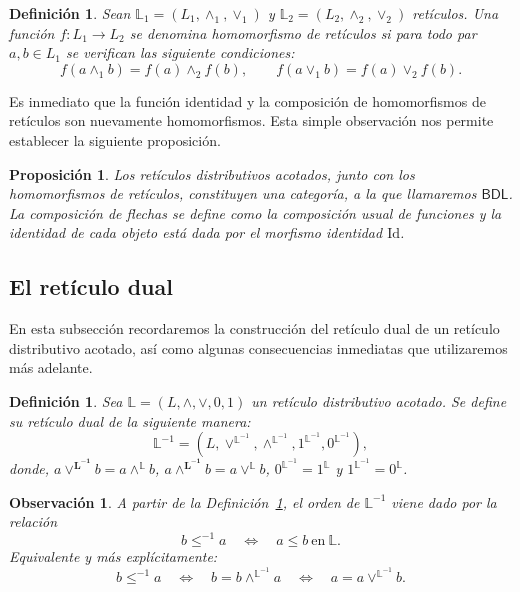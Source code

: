 \documentclass[12pt]{book}
\newtheorem{proposition}[theorem]{Proposición}
\newtheorem{definition}[theorem]{Definición}
\newtheorem{remark}[theorem]{Observación}
\newcommand{\we}{\wedge}
\newcommand{\Id}{\mathrm{Id}}
\newcommand{\BDL}{\mathsf{BDL}}
\begin{document}
\begin{definition}\label{def:homomorfismo_reticulos}
Sean \( \mathbb{L}_{1}=(L_{1},\wedge_{1},\vee_{1}) \) y
\( \mathbb{L}_{2}=(L_{2},\wedge_{2},\vee_{2}) \) retículos.
Una función \( f\colon L_{1}\to L_{2} \) se denomina
\emph{homomorfismo de retículos} si para todo par \( a,b\in L_{1} \) se verifican las siguiente condiciones:
\[
f(a\wedge_{1} b)=f(a)\wedge_{2} f(b), 
\qquad
f(a\vee_{1} b)=f(a)\vee_{2} f(b).
\]
\end{definition}


Es inmediato que la función identidad y la composición de homomorfismos de retículos
son nuevamente homomorfismos. Esta simple observación nos permite establecer la siguiente proposición.


\begin{proposition}
Los retículos distributivos acotados, junto con los homomorfismos de retículos, constituyen una categoría, a la que llamaremos $\BDL$.
La composición de flechas se define como la composición usual de funciones y la identidad de cada objeto está dada por el morfismo identidad \( \Id \).
\end{proposition}


\subsection{El retículo dual}

En esta subsección recordaremos la construcción del retículo dual de 
un retículo distributivo acotado, así como algunas consecuencias 
inmediatas que utilizaremos más adelante.


\begin{definition}\label{def:retículo-dual} Sea $\mathbb{L} = (L,\wedge,\vee,0,1)$ un retículo distributivo acotado. Se define su \emph{retículo dual} de la siguiente manera: 
\[
\mathbb{L}^{-1} = \left(L,\vee^{\mathbb{L}^{-1}},\wedge^{\mathbb{L}^{-1}},1^{\mathbb{L}^{-1}},0^{\mathbb{L}^{-1}}\right),
\]
donde, $a \vee^{\mathbf{L^{-1}}} b = a \we^{\mathbb{L}} b$, $a \we^{\mathbf{L^{-1}}} b = a \vee^{\mathbb{L}} b$, $0^{\mathbb{L}^{-1}} = 1^{\mathbb{L}}$ y $1^{\mathbb{L}^{-1}} = 0^{\mathbb{L}}$.
\end{definition}


\begin{remark}\label{rem:orden-dual}
A partir de la Definición~\ref{def:retículo-dual}, el orden de 
$\mathbb{L}^{-1}$ viene dado por la relación
\[
b \leq^{-1} a
\quad\Longleftrightarrow\quad
a \leq b \ \text{en}\ \mathbb{L}.
\]
Equivalente y más explícitamente:
\[
b \leq^{-1} a
\quad\Longleftrightarrow\quad
b = b \wedge^{\mathbb{L}^{-1}} a
\quad\Longleftrightarrow\quad
a = a \vee^{\mathbb{L}^{-1}} b.
\]
\end{remark}
\end{document}
